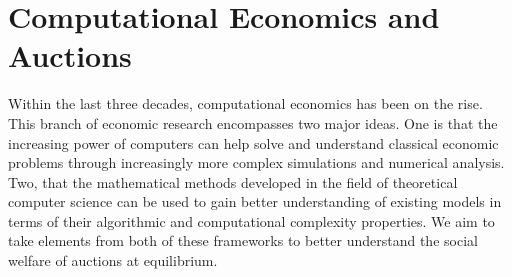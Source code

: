 \documentclass[12pt,twoside]{reedthesis}
\begin{document}
\chapter{Computational Economics and Auctions}
	Within the last three decades, computational economics has been on the rise. This branch of economic research encompasses two major ideas. One is that the increasing power of computers can help solve and understand classical economic problems through increasingly more complex simulations and numerical analysis. Two, that the mathematical methods developed in the field of theoretical computer science can be used to gain better understanding of existing models in terms of their algorithmic and computational complexity properties. We aim to take elements from both of these frameworks to better understand the social welfare of auctions at equilibrium. 
\end{document}
